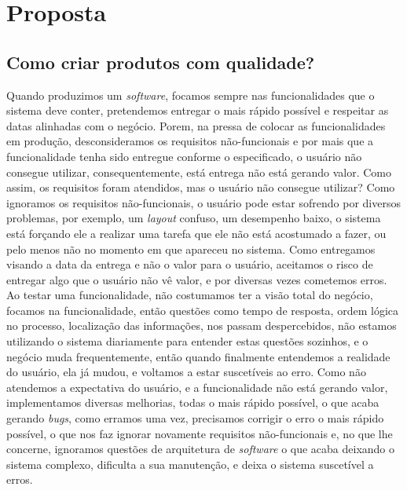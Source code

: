 \part{Proposta}
  \chapter{Como criar produtos com qualidade?}
    Quando produzimos um \textit{software}, focamos sempre nas funcionalidades que
    o sistema deve conter, pretendemos entregar o mais rápido possível e respeitar
    as datas alinhadas com o negócio. Porem, na pressa de colocar as funcionalidades
    em produção, desconsideramos os requisitos não-funcionais e por mais que a
    funcionalidade tenha sido entregue conforme o especificado, o usuário não
    consegue utilizar, consequentemente, está entrega não está gerando valor. \newline
    Como assim, os requisitos foram atendidos, mas o usuário não consegue utilizar?
    Como ignoramos os requisitos não-funcionais, o usuário pode estar sofrendo por
    diversos problemas, por exemplo, um \textit{layout} confuso, um desempenho baixo,
    o sistema está forçando ele a realizar uma tarefa que ele não está acostumado a
    fazer, ou pelo menos não no momento em que apareceu no sistema. Como entregamos
    visando a data da entrega e não o valor para o usuário, aceitamos o risco de
    entregar algo que o usuário não vê valor, e por diversas vezes cometemos erros.
    Ao testar uma funcionalidade, não costumamos ter a visão total do negócio,
    focamos na funcionalidade, então questões como tempo de resposta, ordem lógica
    no processo, localização das informações, nos passam despercebidos, não estamos
    utilizando o sistema diariamente para entender estas questões sozinhos, e o
    negócio muda frequentemente, então quando finalmente entendemos a realidade do
    usuário, ela já mudou, e voltamos a estar suscetíveis ao erro. \newline
    Como não atendemos a expectativa do usuário, e a funcionalidade não está gerando
    valor, implementamos diversas melhorias, todas o mais rápido possível, o que
    acaba gerando \textit{bugs}, como erramos uma vez, precisamos corrigir o erro
    o mais rápido possível, o que nos faz ignorar novamente requisitos não-funcionais
    e, no que lhe concerne, ignoramos questões de arquitetura de \textit{software} o que
    acaba deixando o sistema complexo, dificulta a sua manutenção, e deixa o
    sistema suscetível a erros. \newline
